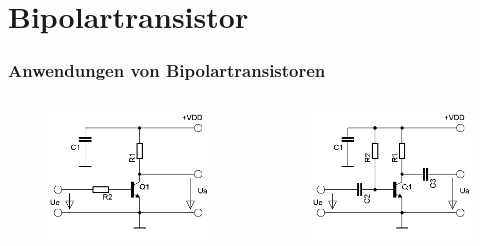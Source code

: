 \section*{Bipolar\-transistor}
\begin{frame}
  \frametitle{Anwendungen von Bipolartransistoren}
  \begin{columns}
    \begin{center}
      \begin{figure}
        \includegraphics[width=\textwidth,height=.7\textheight,keepaspectratio]{a06/Transistor-Schalter.png}
      \end{figure}
    \end{center}
    \begin{center}
      \begin{figure}
        \includegraphics[width=\textwidth,height=.7\textheight,keepaspectratio]{a06/Transistor-Verstaerker.png}

\end{figure}
\end{center}
\end{columns}
\end{frame}

